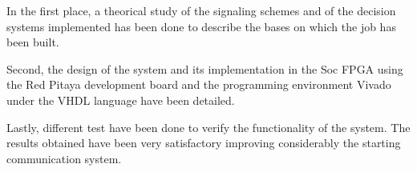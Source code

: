 In the first place, a theorical study of the signaling schemes and of the decision systems
implemented has been done to describe the bases on which the job has been built.

Second, the design of the system and its implementation in the Soc
FPGA using the Red Pitaya development board and the programming environment
Vivado under the VHDL language have been detailed.

Lastly, different test have been done to verify the functionality of the system.
The results obtained have been very satisfactory improving considerably the starting
communication system.

\blankpage
